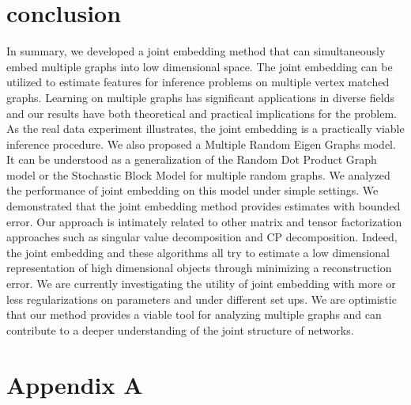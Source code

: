 \documentclass[10pt,journal,compsoc]{IEEEtran}
\begin{document}
\section{conclusion}
In summary, we developed a joint embedding method that can simultaneously embed multiple graphs into low dimensional space. The joint embedding can be utilized to estimate features for inference problems on multiple vertex matched graphs. Learning on multiple graphs has significant applications in diverse fields and our results have both theoretical and practical implications for the problem. As the real data experiment illustrates, the joint embedding is a practically viable inference procedure. We also proposed a Multiple Random Eigen Graphs model. It can be understood as a generalization of the Random Dot Product Graph model or the Stochastic Block Model for multiple random graphs. We analyzed the performance of joint embedding on this model under simple settings. We demonstrated that the joint embedding method provides estimates with bounded error. Our approach is intimately related to other matrix and tensor factorization approaches such as singular value decomposition and CP decomposition. Indeed, the joint embedding and these algorithms all try to estimate a low dimensional representation of high dimensional objects through minimizing a reconstruction error. We are currently investigating the utility of joint embedding with more or less regularizations on parameters and under different set ups. We are optimistic that our method provides a viable tool for analyzing multiple graphs and can contribute to a deeper understanding of the joint structure of networks.


\section*{Appendix A}
\end{document}
